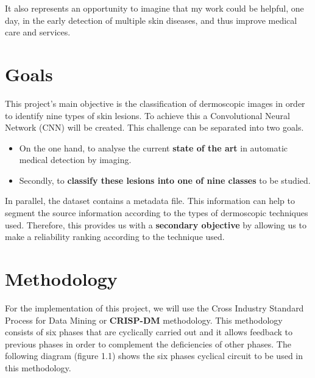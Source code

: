 It also represents an opportunity to imagine that my work could be helpful, one day, in the early detection of multiple skin diseases, and thus improve medical care and services.



\section{Goals}


This project's main objective is the classification of dermoscopic images in order to identify nine types of skin lesions. To achieve this a Convolutional Neural Network (CNN) will be created. This challenge can be separated into two goals.

\begin{itemize}
    \item On the one hand, to analyse the current \textbf{state of the art} in automatic medical detection by imaging.
    \item Secondly, to \textbf{classify these lesions into one of nine classes} to be studied.
\end{itemize}

In parallel, the dataset contains a metadata file. This information can help to segment the source information according to the types of dermoscopic techniques used. Therefore, this provides us with a \textbf{secondary objective} by allowing us to make a reliability ranking according to the technique used. 


\section{Methodology}


For the implementation of this project, we will use the Cross Industry Standard Process for Data Mining or \textbf{CRISP-DM} methodology. This methodology consists of six phases that are cyclically carried out and it allows feedback to previous phases in order to complement the deficiencies of other phases. The following diagram (figure 1.1) shows the six phases cyclical circuit to be used in this methodology.

